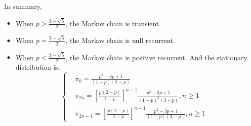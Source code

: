 \documentclass{article}
\begin{document}
In summary,

\begin{itemize}
    \item When $p>\frac{3-\sqrt{5}}{2}$, the Markov chain is transient.
    \item When $p=\frac{3-\sqrt{5}}{2}$, the Markov chain is null recurrent.
    \item When $p<\frac{3-\sqrt{5}}{2}$, the Markov chain is positive recurrent. And the stationary distribution is, \begin{equation}
        \left\{\begin{aligned}
            &\pi_0 = \frac{p^2-3p+1}{(1-p)(3-p)} \\
            &\pi_{2n} = \left[\frac{p(2-p)}{1-p}\right]^{n-1}  \frac{p^2-3p+1}{(1-p)^2(3-p)},n\geqslant 1 \\
            & \pi_{2n-1} = \left[\frac{p(2-p)}{1-p}\right]^{n-1}  \frac{p^2-3p+1}{(1-p)(3-p)},n\geqslant 1
        \end{aligned}
            \right.
    \end{equation}
\end{itemize}









\end{document}
